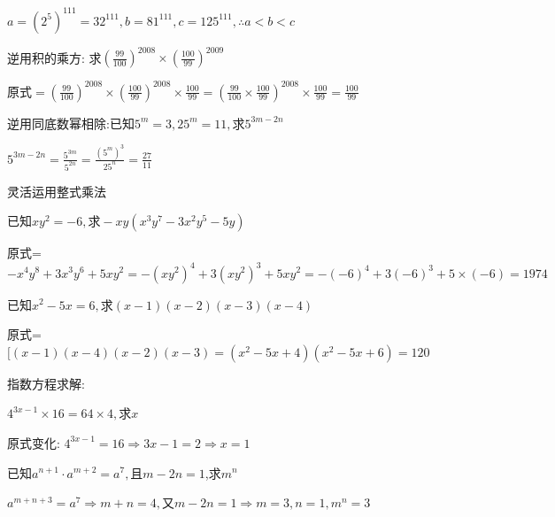 \documentclass[cn,blue,12pt]{elegantbook}
\begin{document}
\begin{liti}[resume]
\begin{solution}
        \(a=(2^5)^{111}=32^{111}, b=81^{111}, c=125^{111}, \therefore a<b<c\)\\
\end{solution}
\item 逆用积的乘方: 求\((\frac{99}{100})^{2008} \times (\frac{100}{99})^{2009}\)
\begin{solution}
        原式\(= (\frac{99}{100})^{2008} \times (\frac{100}{99})^{2008} \times \frac{100}{99}=(\frac{99}{100} \times \frac{100}{99})^{2008} \times \frac{100}{99}=\frac{100}{99}\)\\
\end{solution}
\item 逆用同底数幂相除:已知\(5^m=3,25^m=11,\text{求}5^{3m-2n}\)
\begin{solution}
        \(5^{3m-2n}=\frac{5^{3m}}{5^{2n}}=\frac{(5^m)^3}{25^n}=\frac{27}{11}\)\\
\end{solution}
\item 灵活运用整式乘法
    \begin{liti}
    \item 已知\(xy^2=-6, \text{求} -xy(x^3y^7-3x^2y^5-5y)\)
\begin{solution}
            原式=\(-x^4y^8 + 3x^3y^6 + 5xy^2 = -(xy^2)^4 + 3(xy^2)^3 + 5xy^2 = -(-6)^4 +3(-6)^3 +5\times (-6)=1974\)\\
\end{solution}
    \item 已知\(x^2 - 5x=6, \text{求} (x-1)(x-2)(x-3)(x-4)\)
\begin{solution}
            原式=\([(x-1)(x-4)(x-2)(x-3)=(x^2-5x+4)(x^2-5x+6)=120\)\\
\end{solution}
    \end{liti}
\item 指数方程求解:
    \begin{liti}
    \item \(4^{3x-1} \times 16 = 64 \times 4, \text{求}x\)
\begin{solution}
            原式变化: \(4^{3x-1} = 16 \Rightarrow 3x-1=2 \Rightarrow x=1\)\\
\end{solution}
    \item 已知\(a^{n+1}\cdot a^{m+2}=a^7,\text{且}m-2n=1\),求\(m^n\)
\begin{solution}
            \(a^{m+n+3}=a^7 \Rightarrow m+n=4, \text{又}m-2n=1 \Rightarrow m=3,n=1, m^n=3\)\\
\end{solution}

\end{liti}
\end{liti}
\end{document}
